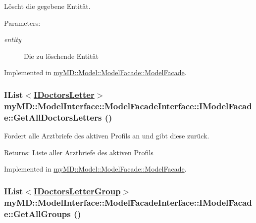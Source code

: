 L\"{o}scht die gegebene Entit\"{a}t. 

\begin{Desc}
\item[Parameters:]
\begin{description}
\item[{\em entity}]Die zu l\"{o}schende Entit\"{a}t\end{description}
\end{Desc}


Implemented in \hyperlink{classmy_m_d_1_1_model_1_1_model_facade_1_1_model_facade_1ec3022b27f9091440cb495f510d25b0}{my\-MD::Model::Model\-Facade::Model\-Facade}.\hypertarget{interfacemy_m_d_1_1_model_interface_1_1_model_facade_interface_1_1_i_model_facade_d824e78a8274c2fc04719a66a7030fd7}{
\subsubsection[GetAllDoctorsLetters]{\setlength{\rightskip}{0pt plus 5cm}IList$<$\hyperlink{interfacemy_m_d_1_1_model_interface_1_1_data_model_interface_1_1_i_doctors_letter}{IDoctors\-Letter}$>$ my\-MD::Model\-Interface::Model\-Facade\-Interface::IModel\-Facade::Get\-All\-Doctors\-Letters ()}}
\label{de/d3e/interfacemy_m_d_1_1_model_interface_1_1_model_facade_interface_1_1_i_model_facade_d824e78a8274c2fc04719a66a7030fd7}


Fordert alle Arztbriefe des aktiven Profils an und gibt diese zur\"{u}ck. 

\begin{Desc}
\item[Returns:]Liste aller Arztbriefe des aktiven Profils\end{Desc}


Implemented in \hyperlink{classmy_m_d_1_1_model_1_1_model_facade_1_1_model_facade_d824e78a8274c2fc04719a66a7030fd7}{my\-MD::Model::Model\-Facade::Model\-Facade}.\hypertarget{interfacemy_m_d_1_1_model_interface_1_1_model_facade_interface_1_1_i_model_facade_5975f81012b1229ab03cbfa932f3a8ae}{
\subsubsection[GetAllGroups]{\setlength{\rightskip}{0pt plus 5cm}IList$<$\hyperlink{interfacemy_m_d_1_1_model_interface_1_1_data_model_interface_1_1_i_doctors_letter_group}{IDoctors\-Letter\-Group}$>$ my\-MD::Model\-Interface::Model\-Facade\-Interface::IModel\-Facade::Get\-All\-Groups ()}}
\label{de/d3e/interfacemy_m_d_1_1_model_interface_1_1_model_facade_interface_1_1_i_model_facade_5975f81012b1229ab03cbfa932f3a8ae}


